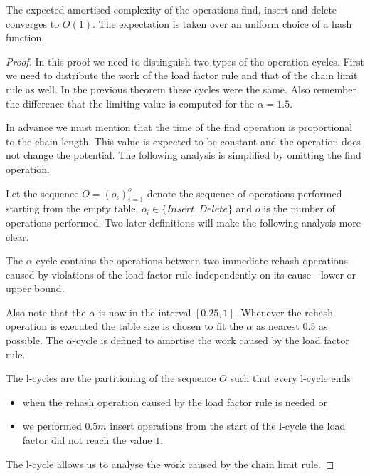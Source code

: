 \begin{theorem}
The expected amortised complexity of the operations find, insert and delete converges to $O(1)$. The expectation is taken over an uniform choice of a hash function.
\end{theorem}
\begin{proof}
In this proof we need to distinguish two types of the operation cycles. First we need to distribute the work of the load factor rule and that of the chain limit rule as well. In the previous theorem these cycles were the same. Also remember the difference that the limiting value is computed for the $\alpha = 1.5$.

In advance we must mention that the time of the find operation is proportional to the chain length. This value is expected to be constant and the operation does not change the potential. The following analysis is simplified by omitting the find operation.

Let the sequence $O = (o_i)_{i=1}^o$ denote the sequence of operations performed starting from the empty table, $o_i \in \lbrace Insert, Delete \rbrace$ and $o$ is the number of operations performed. Two later definitions will make the following analysis more clear.

\begin{definition}
The $\alpha$-cycle contains the operations between two immediate rehash operations caused by violations of the load factor rule independently on its cause - lower or upper bound. 
\end{definition}
Also note that the $\alpha$ is now in the interval $\left[0.25, 1\right]$. Whenever the rehash operation is executed the table size is chosen to fit the $\alpha$ as nearest $0.5$ as possible. The $\alpha$-cycle is defined to amortise the work caused by the load factor rule.

\begin{definition}[l-cycle]
The l-cycles are the partitioning of the sequence $O$ such that every l-cycle ends
\begin{itemize}
\item when the rehash operation caused by the load factor rule is needed or
\item we performed $0.5 m$ insert operations from the start of the l-cycle the load factor did not reach the value $1$.
\end{itemize}
\end{definition}
The l-cycle allows us to analyse the work caused by the chain limit rule.


\end{proof}
